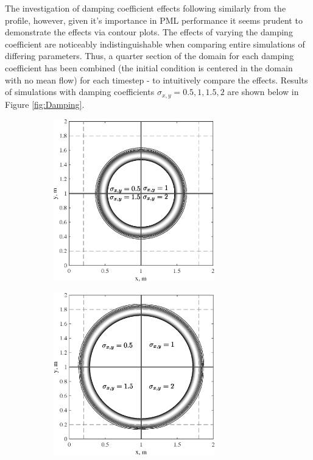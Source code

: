 The investigation of damping coefficient effects following similarly from the profile, however, given it's importance in PML performance it seems prudent to demonstrate the effects via contour plots. The effects of varying the damping coefficient are noticeably indistinguishable when comparing entire simulations of differing parameters. Thus, a quarter section of the domain for each damping coefficient has been combined (the initial condition is centered in the domain with no mean flow) for each timestep - to intuitively compare the effects. Results of simulations with damping coefficients $\sigma_{x,y}=0.5, 1, 1.5, 2$ are shown below in Figure \ref{fig:Damping}.


\begin{figure}[h!]
        \centering
        \begin{subfigure}[b]{0.475\textwidth}
            \centering
            \includegraphics[width=7cm]{Figures/TechnicalAchievement/Res/Damping05s.eps}
            \caption{}    
            \label{fig:Damping05}
        \end{subfigure}
        \hfill
        \begin{subfigure}[b]{0.475\textwidth}  
            \centering 
            \includegraphics[width=7cm]{Figures/TechnicalAchievement/Res/Damping075s.eps}

\end{subfigure}
\end{figure}
